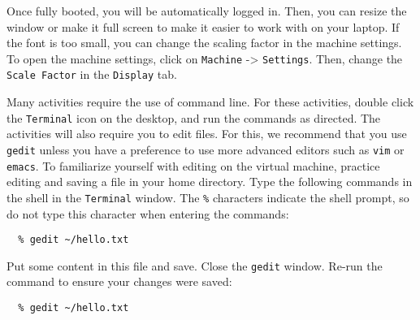 \documentclass[11pt]{article}
\begin{document}
Once fully booted, you will be automatically logged in. Then, you can
resize the window or make it full screen to make it easier to work with
on your laptop. If the font is too small, you can change the scaling factor
in the machine settings. To open the machine settings, click on
\texttt{Machine} -> \texttt{Settings}. Then, change the \texttt{Scale Factor}
in the \texttt{Display} tab.

Many activities require the use of command line. For these
activities, double click the \texttt{Terminal} icon on the desktop, and run
the commands as directed. The activities will also require you to edit files.
For this, we recommend that you use \texttt{gedit} unless you have a
preference to use more advanced editors such as \texttt{vim} or
\texttt{emacs}. To familiarize yourself with editing on the virtual machine,
practice editing and saving a file in your home directory. Type the
following commands in the shell in the \texttt{Terminal} window. The
\texttt{\%} characters indicate the shell prompt, so do not type this
character when entering the commands:

\vspace{-0.05in}
\begin{verbatim}
  % gedit ~/hello.txt
\end{verbatim}
\vspace{-0.05in}

Put some content in this file and save. Close the \texttt{gedit} window.
Re-run the command to ensure your changes were saved:

\vspace{-0.05in}
\begin{verbatim}
  % gedit ~/hello.txt
\end{verbatim}
\vspace{-0.05in}
\end{document}
